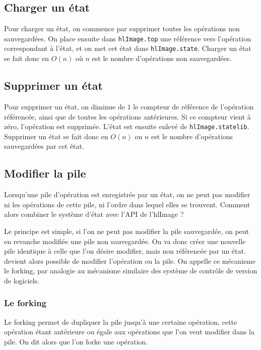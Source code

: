 		\subsection{Charger un état}
		Pour charger un état, on commence par supprimer toutes les opérations non sauvegardées. On place ensuite dans \lstinline$hlImage.top$ une
		référence vers l'opération correspondant à l'état, et on met cet état dans \lstinline$hlImage.state$. Charger un état se fait donc en
		$O(n)$ où $n$ est le nombre d'opérations non sauvegardées.
		\subsection{Supprimer un état}
		Pour supprimer un état, on diminue de $1$ le compteur de référence de l'opération référencée, ainsi que de toutes les opérations antérieures.
		Si ce compteur vient à zéro, l'opération est supprimée. L'état est ensuite enlevé de \lstinline$hlImage.statelib$.
		Supprimer un état se fait donc en $O(n)$ ou $n$ est le nombre d'opérations sauvegardées par cet état.
		\subsection{Modifier la pile}
		Lorsqu'une pile d'opération est enregistrée par un état, on ne peut pas modifier ni les opérations de cette pile, ni l'ordre dans lequel elles
		se trouvent. Comment alors combiner le système d'état avec l'API de l'hlImage ? 

		Le principe est simple, si l'on ne peut pas modifier la pile sauvegardée, on peut en revanche modifiée une pile non sauvegardée. 
		On va donc créer une nouvelle pile identique à celle que l'on désire modifier, mais non référencée par un état.
		devient alors possible de modifier l'opération ou la pile. On appelle ce mécanisme le forking, par analogie au mécanisme
		similaire des système de contrôle de version de logiciels.
		
		\subsubsection{Le forking}
			Le forking permet de dupliquer la pile jusqu'à une certaine opération, cette opération étant antérieure ou égale aux opérations que
			l'on veut modifier dans la pile. On dit alors que l'on forke une opération.

